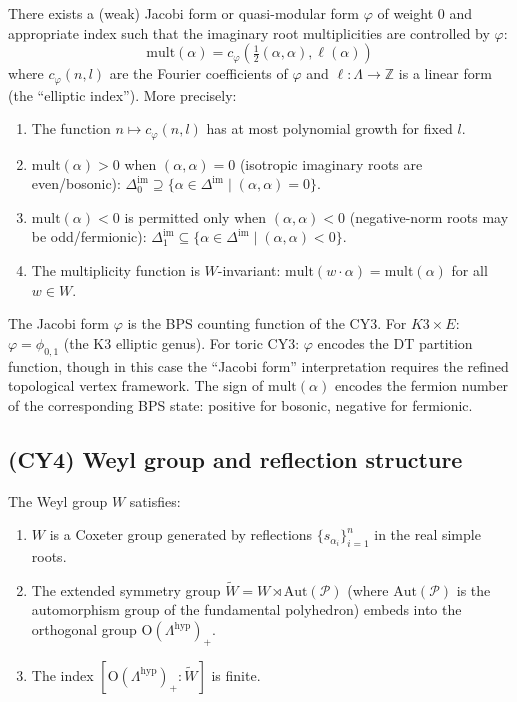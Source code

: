 There exists a (weak) Jacobi form or quasi-modular form $\varphi$ of weight $0$ and appropriate index such that the imaginary root multiplicities are controlled by $\varphi$:
\[
 \mathrm{mult}(\alpha) = c_\varphi(\tfrac{1}{2}(\alpha, \alpha), \ell(\alpha))
\]
where $c_\varphi(n, l)$ are the Fourier coefficients of $\varphi$ and $\ell \colon \Lambda \to \mathbb{Z}$ is a linear form (the ``elliptic index''). More precisely:
\begin{enumerate}[label=(\alph*)]
 \item The function $n \mapsto c_\varphi(n, l)$ has at most polynomial growth for fixed $l$.
 \item $\mathrm{mult}(\alpha) > 0$ when $(\alpha, \alpha) = 0$ (isotropic imaginary roots are even/bosonic): $\Delta^{\mathrm{im}}_0 \supseteq \{\alpha \in \Delta^{\mathrm{im}} \mid (\alpha, \alpha) = 0\}$.
 \item $\mathrm{mult}(\alpha) < 0$ is permitted only when $(\alpha, \alpha) < 0$ (negative-norm roots may be odd/fermionic): $\Delta^{\mathrm{im}}_1 \subseteq \{\alpha \in \Delta^{\mathrm{im}} \mid (\alpha, \alpha) < 0\}$.
 \item The multiplicity function is $W$-invariant: $\mathrm{mult}(w \cdot \alpha) = \mathrm{mult}(\alpha)$ for all $w \in W$.
\end{enumerate}

\begin{remark}
\label{rem:cy3-bps}
The Jacobi form $\varphi$ is the BPS counting function of the CY3. For $K3 \times E$: $\varphi = \phi_{0,1}$ (the K3 elliptic genus). For toric CY3: $\varphi$ encodes the DT partition function, though in this case the ``Jacobi form'' interpretation requires the refined topological vertex framework. The sign of $\mathrm{mult}(\alpha)$ encodes the fermion number of the corresponding BPS state: positive for bosonic, negative for fermionic.
\end{remark}

\subsection*{(CY4) Weyl group and reflection structure}

The Weyl group $W$ satisfies:
\begin{enumerate}[label=(\alph*)]
 \item $W$ is a Coxeter group generated by reflections $\{s_{\alpha_i}\}_{i=1}^n$ in the real simple roots.
 \item The extended symmetry group $\widetilde{W} = W \rtimes \mathrm{Aut}(\mathcal{P})$ (where $\mathrm{Aut}(\mathcal{P})$ is the automorphism group of the fundamental polyhedron) embeds into the orthogonal group $\mathrm{O}(\Lambda^{\mathrm{hyp}})_+$.
 \item The index $[\mathrm{O}(\Lambda^{\mathrm{hyp}})_+ : \widetilde{W}]$ is finite.
\end{enumerate}

